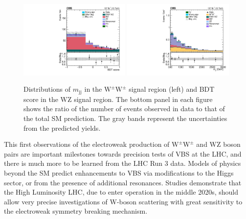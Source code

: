 \documentclass[12pt]{article}
\newcommand{\WZ}{\ensuremath{\mathrm{W}\mathrm{Z}}}
\newcommand{\WW}{\ensuremath{\mathrm{W}^\pm\mathrm{W}^\pm}}
\newcommand{\jet}{\ensuremath{\mathrm{j}}}
\newcommand{\mjj}{\ensuremath{m_{\jet\jet}}}
\begin{document}
\begin{figure}[htb]
\centering
\includegraphics[width=0.49\textwidth]{figures/ssww_wzsel_bdt_2019.pdf}
\includegraphics[width=0.49\textwidth]{figures/ssww_wwsel_mjj_2019.pdf}
\caption{Distributions of $\mjj$ in the $\WW$ signal region (left) and  BDT score in the $\WZ$ signal region. The bottom panel in each figure
shows the ratio of the number of events observed in data to that of the total SM prediction.
The gray bands represent the uncertainties from the predicted yields.}
\label{fig:signal}
\end{figure}

This first observations of the  electroweak production of $\WW$ and $\WZ$  boson pairs are important milestones towards precision tests of VBS at the LHC, and there is much more to be learned from the LHC Run 3 data. Models of physics beyond the SM predict enhancements to VBS via modifications to the Higgs sector, or from the presence of additional resonances. Studies demonstrate that the High Luminosity LHC, due to enter operation in the middle 2020s, should allow very precise investigations of W-boson scattering with great sensitivity to the electroweak symmetry breaking mechanism.
\end{document}
